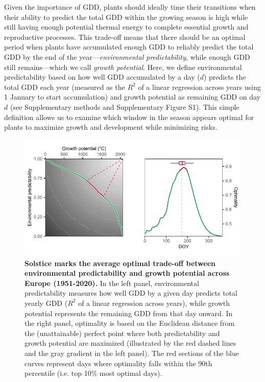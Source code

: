 \documentclass[11pt,letter]{article}
\begin{document}
Given the importance of GDD, plants should ideally time their transitions when their ability to predict the total GDD within the growing season is high while still having enough potential thermal energy to complete essential growth and reproductive processes. This trade-off means that there should be an optimal period when plants have accumulated enough GDD to reliably predict the total GDD by the end of the year---\emph{environmental predictability}, while enough GDD still remains---which we call \emph{growth potential}. Here, we define environmental predictability based on how well GDD accumulated by a day ($d$) predicts the total GDD each year (measured as the $R^2$ of a linear regression across years using 1 January to start accumulation) and growth potential as remaining GDD on day $d$ (see Supplementary methods and Supplementary Figure S1). %
This simple definition allows us to examine which window in the season appears optimal for plants to maximize growth and development while minimizing risks.

\begin{figure}[h]
\centering
\includegraphics{global_optimality.pdf}
\vspace*{-0.7cm}
\caption{\textbf{Solstice marks the average optimal trade-off between environmental predictability and growth potential across Europe (1951-2020).} In the left panel, environmental predictability measures how well GDD by a given day predicts total yearly GDD ($R^2$ of a linear regression across years), while growth potential represents the remaining GDD from that day onward. In the right panel, optimality is based on the Euclidean distance from the (unattainable) perfect point where both predictability and growth potential are maximized (illustrated by the red dashed lines and the gray gradient in the left panel). The red sections of the blue curves represent days where optimality falls within the 90th percentile (i.e. top 10\% most optimal days).} 
\label{fig:globaloptimality}
\end{figure}
\end{document}
